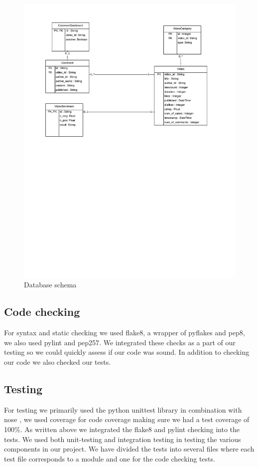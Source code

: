 \documentclass[conference]{IEEEtran}
\begin{document}
\begin{figure}[b]
\centering
\includegraphics[width=\columnwidth]{database.png}
\caption{Database schema}
\label{fig:database}
\end{figure}


\subsection{Code checking}
For syntax and static checking we used flake8\cite{flake8}, a wrapper of pyflakes and pep8, we also used pylint\cite{pylint} and pep257\cite{pep257}.
We integrated these checks as a part of our testing so we could quickly assess if our code was sound.  
In addition to checking our code we also checked our tests.

\subsection{Testing}
For testing we primarily used the python unittest library in combination with nose \cite{nose}, we used coverage \cite{coverage} for code coverage making sure we had a test coverage of 100\%. 
As written above we integrated the flake8 and pylint checking into the tests.
We used both unit-testing and integration testing in testing the various components in our project.
We have divided the tests into several files where each test file corresponds to a module and one for the code checking tests.
\end{document}
